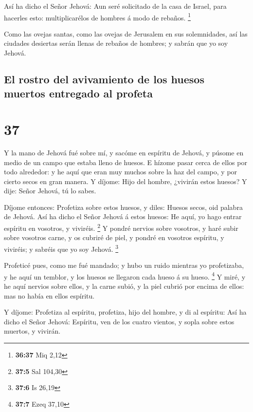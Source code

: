  Así ha dicho el Señor Jehová: Aun seré solicitado de la
casa de Israel, para hacerles esto: multiplicarélos de hombres á modo de
rebaños. \footnote{\textbf{36:37} Miq 2,12}

 Como las ovejas santas, como las ovejas de Jerusalem en
sus solemnidades, así las ciudades desiertas serán llenas de rebaños de
hombres; y sabrán que yo soy Jehová.

\hypertarget{el-rostro-del-avivamiento-de-los-huesos-muertos-entregado-al-profeta}{%
\subsection{El rostro del avivamiento de los huesos muertos entregado al
profeta}\label{el-rostro-del-avivamiento-de-los-huesos-muertos-entregado-al-profeta}}

\hypertarget{section-36}{%
\section{37}\label{section-36}}

 Y la mano de Jehová fué sobre mí, y sacóme en espíritu de
Jehová, y púsome en medio de un campo que estaba lleno de huesos.
 E hízome pasar cerca de ellos por todo alrededor: y he aquí
que eran muy muchos sobre la haz del campo, y por cierto secos en gran
manera.  Y díjome: Hijo del hombre, ¿vivirán estos huesos? Y
dije: Señor Jehová, tú lo sabes.

 Díjome entonces: Profetiza sobre estos huesos, y diles:
Huesos secos, oid palabra de Jehová.  Así ha dicho el Señor
Jehová á estos huesos: He aquí, yo hago entrar espíritu en vosotros, y
viviréis. \footnote{\textbf{37:5} Sal 104,30}  Y pondré
nervios sobre vosotros, y haré subir sobre vosotros carne, y os cubriré
de piel, y pondré en vosotros espíritu, y viviréis; y sabréis que yo soy
Jehová. \footnote{\textbf{37:6} Is 26,19}

 Profeticé pues, como me fué mandado; y hubo un ruido
mientras yo profetizaba, y he aquí un temblor, y los huesos se llegaron
cada hueso á su hueso. \footnote{\textbf{37:7} Ezeq 37,10} 
Y miré, y he aquí nervios sobre ellos, y la carne subió, y la piel
cubrió por encima de ellos: mas no había en ellos espíritu.

 Y díjome: Profetiza al espíritu, profetiza, hijo del
hombre, y di al espíritu: Así ha dicho el Señor Jehová: Espíritu, ven de
los cuatro vientos, y sopla sobre estos muertos, y vivirán.

